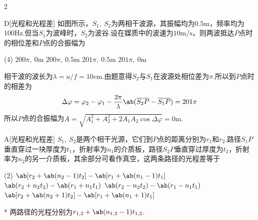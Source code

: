 \begin{paracol}{2}
    \begin{choice}{D}[光程和光程差]
        如图所示，$S_1,\ S_2$为两相干波源，其振幅均为$0.5\mathrm{m}$，频率均为$100\mathrm{Hz}$.但当$S_1$为波峰时，$S_2$为波谷.设在媒质中的波速为$10\mathrm{m/s}$，则两波抵达$P$点时的相位差和$P$点的合振幅为
        \begin{tasks}(4)
            \task $200\pi,\ 0\mathrm{m}$
            \task $200\pi,\ 0.5\mathrm{m}$
            \task $201\pi,\ 0.5\mathrm{m}$
            \task $201\pi,\ 0\mathrm{m}$
        \end{tasks}    
    \end{choice}
\switchcolumn\centering
\vfill
{}
\vfill
\end{paracol}
\begin{solution}
    相干波的波长为$\lambda=u/f=10\mathrm{cm}$.由题意得$S_2$与$S_1$在波源处相位差为$\pi$.所以到$P$点时的相差为
    $$\Delta\varphi=\varphi_2-\varphi_1-\frac{2\pi}{\lambda}\ab(\overline{S_2P}-\overline{S_1P})=201\pi$$
    所以$P$点的合振幅为$A=\sqrt{A_1^2+A_2^2+2A_1A_2\cos{\Delta\varphi}}=0\mathrm{m}$.
\end{solution}

\begin{choice}{A}[光程和光程差]
    $S_1,\ S_2$是两个相干光源，它们到$P$点的距离分别为$r_1$和$r_2$.路径$S_1P$垂直穿过一块厚度为$t_1$，折射率为$n_1$的介质板，路径$S_2P$垂直穿过厚度为$t_2$，折射率为$n_2$的另一介质板，其余部分可看作真空，这两条路径的光程差等于
    \begin{tasks}(2)
        \task $\ab[r_2+\ab(n_2-1)t_2]-\ab[r_1+\ab(n_1-1)t_1]$
        \task $\ab(r_2+n_2t_2)-\ab(r_1+n_1t_1)$
        \task $\ab(r_2-n_2t_2)-\ab(r_1-n_1t_1)$
        \task $\ab[r_2+\ab(n_2+1)t_2]-\ab[r_1+\ab(n_1+1)t_1]$
    \end{tasks}
\end{choice}
\begin{solution}*
    两路径的光程分别为$r_{1,2}+\ab(n_{1,2}-1)t_{1,2}$.
\end{solution}


